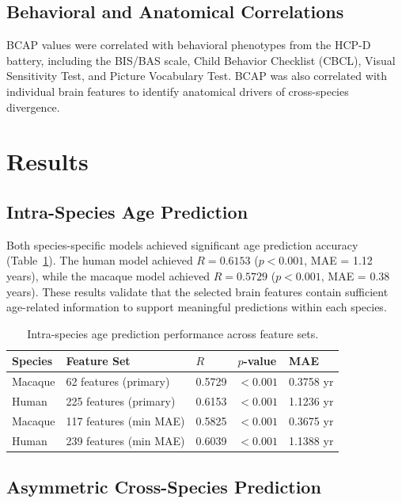 \documentclass[12pt]{article}
\begin{document}
\subsection{Behavioral and Anatomical Correlations}

BCAP values were correlated with behavioral phenotypes from the HCP-D battery, including the BIS/BAS scale, Child Behavior Checklist (CBCL), Visual Sensitivity Test, and Picture Vocabulary Test. BCAP was also correlated with individual brain features to identify anatomical drivers of cross-species divergence.

\section{Results}

\subsection{Intra-Species Age Prediction}

Both species-specific models achieved significant age prediction accuracy (Table~\ref{tab:intra}). The human model achieved $R = 0.6153$ ($p < 0.001$, MAE = 1.12 years), while the macaque model achieved $R = 0.5729$ ($p < 0.001$, MAE = 0.38 years). These results validate that the selected brain features contain sufficient age-related information to support meaningful predictions within each species.

\begin{table}[H]
\centering
\caption{Intra-species age prediction performance across feature sets.}
\label{tab:intra}
\begin{tabular}{lllll}
\toprule
Species & Feature Set & $R$ & $p$-value & MAE \\
\midrule
Macaque & 62 features (primary) & 0.5729 & $< 0.001$ & 0.3758 yr \\
Human & 225 features (primary) & 0.6153 & $< 0.001$ & 1.1236 yr \\
Macaque & 117 features (min MAE) & 0.5825 & $< 0.001$ & 0.3675 yr \\
Human & 239 features (min MAE) & 0.6039 & $< 0.001$ & 1.1388 yr \\
\bottomrule
\end{tabular}
\end{table}

\subsection{Asymmetric Cross-Species Prediction}
\end{document}
